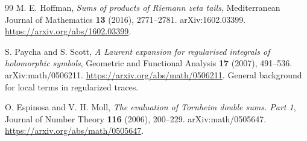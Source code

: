 \begin{thebibliography}{99}
M. E. Hoffman,
\emph{Sums of products of Riemann zeta tails},
Mediterranean Journal of Mathematics \textbf{13} (2016), 2771--2781.
arXiv:1602.03399.
\url{https://arxiv.org/abs/1602.03399}.

S. Paycha and S. Scott,
\emph{A Laurent expansion for regularised integrals of holomorphic symbols},
Geometric and Functional Analysis \textbf{17} (2007), 491--536.
arXiv:math/0506211.
\url{https://arxiv.org/abs/math/0506211}.
General background for local terms in regularized traces.

O. Espinosa and V. H. Moll,
\emph{The evaluation of Tornheim double sums. Part 1},
Journal of Number Theory \textbf{116} (2006), 200--229.
arXiv:math/0505647.
\url{https://arxiv.org/abs/math/0505647}.
\end{thebibliography}
